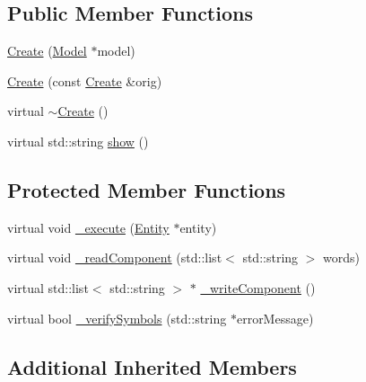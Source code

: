 \subsection*{Public Member Functions}
\begin{DoxyCompactItemize}
\item 
\hyperlink{class_create_a81bd7a50b926660c264ebe29e2095170}{Create} (\hyperlink{class_model}{Model} $\ast$model)
\item 
\hyperlink{class_create_a035a6f7ddd02dace181b23913b91bad9}{Create} (const \hyperlink{class_create}{Create} \&orig)
\item 
virtual \hyperlink{class_create_a6060fda2b105228446ddddb09f63d127}{$\sim$\-Create} ()
\item 
virtual std\-::string \hyperlink{class_create_a8d1832d2165bbeea4a5a88aded883f86}{show} ()
\end{DoxyCompactItemize}
\subsection*{Protected Member Functions}
\begin{DoxyCompactItemize}
\item 
virtual void \hyperlink{class_create_acd3a4b8805561591e0c88d3fd689cf74}{\-\_\-execute} (\hyperlink{class_entity}{Entity} $\ast$entity)
\item 
virtual void \hyperlink{class_create_afccd427ad3821a95308498892dfe58f3}{\-\_\-read\-Component} (std\-::list$<$ std\-::string $>$ words)
\item 
virtual std\-::list$<$ std\-::string $>$ $\ast$ \hyperlink{class_create_ab0fd0c7afa14e91a82ecd151d22ce20b}{\-\_\-write\-Component} ()
\item 
virtual bool \hyperlink{class_create_ad445fd3bec94b4e66669089f10f96057}{\-\_\-verify\-Symbols} (std\-::string $\ast$error\-Message)
\end{DoxyCompactItemize}
\subsection*{Additional Inherited Members}


